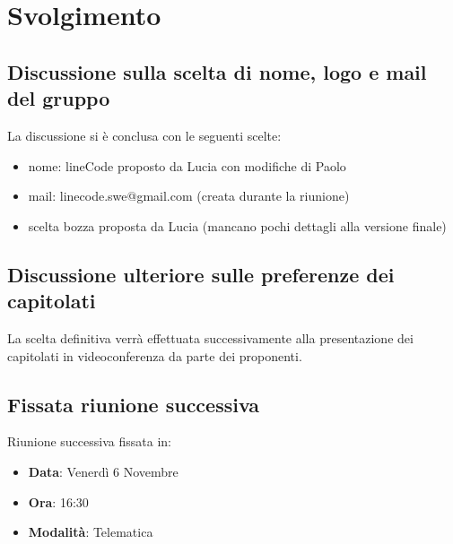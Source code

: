 \documentclass[]{article}
\begin{document}
	\newpage

	\section{Svolgimento}
		\subsection{Discussione sulla scelta di nome, logo e mail del gruppo}
		La discussione si è conclusa con le seguenti scelte:
		\begin{itemize}
				\item nome: lineCode proposto da Lucia con modifiche di Paolo
				\item mail: linecode.swe@gmail.com (creata durante la riunione)
				\item scelta bozza proposta da Lucia (mancano pochi dettagli
	      	      alla versione finale)
			\end{itemize}
	      	      
		\subsection{Discussione ulteriore sulle preferenze dei capitolati}
		La scelta definitiva verrà effettuata successivamente alla
	    presentazione dei capitolati in videoconferenza da parte dei proponenti.

		\subsection{Fissata riunione successiva}
		Riunione successiva fissata in:
		\begin{itemize}
			\item \textbf{Data}: Venerdì 6 Novembre
			\item \textbf{Ora}: 16:30
			\item \textbf{Modalità}: Telematica
		\end{itemize}
\end{document}

